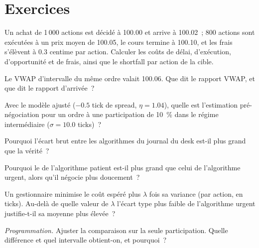 \section{Exercices}

\begin{exercise}[$\star$]\label{exo:mx:transaction-cost-analysis:1}
Un achat de 1\,000 actions est décidé à 100.00 et arrive à 100.02~; 800 actions sont exécutées à un prix moyen de 100.05, le cours termine à 100.10, et les frais s'élèvent à 0.3
centime par action. Calculer les coûts de délai, d'exécution, d'opportunité et de frais, ainsi que le shortfall par action de la cible.
\end{exercise}

\begin{exercise}[$\star$]\label{exo:mx:transaction-cost-analysis:2}
Le VWAP d'intervalle du même ordre valait 100.06. Que dit le rapport VWAP, et que dit le rapport d'arrivée~?
\end{exercise}

\begin{exercise}[$\star$]\label{exo:mx:transaction-cost-analysis:3}
Avec le modèle ajusté ($-0.5$ tick de spread, $\eta=1.04$), quelle est l'estimation pré-négociation pour un ordre à une participation de 10~\% dans le régime intermédiaire
($\sigma=10.0$ ticks)~?
\end{exercise}

\begin{exercise}[$\star\star$]\label{exo:mx:transaction-cost-analysis:4}
Pourquoi l'écart brut entre les algorithmes du journal du desk est-il plus grand que la vérité~?
\end{exercise}

\begin{exercise}[$\star\star$]\label{exo:mx:transaction-cost-analysis:5}
Pourquoi le  de l'algorithme patient est-il plus grand que celui de l'algorithme urgent, alors qu'il négocie plus doucement~?
\end{exercise}

\begin{exercise}[$\star\star$]\label{exo:mx:transaction-cost-analysis:6}
Un gestionnaire minimise le coût espéré plus $\lambda$ fois sa variance (par action, en ticks). Au-delà de quelle valeur de $\lambda$ l'écart type plus faible de l'algorithme urgent
justifie-t-il sa moyenne plus élevée~?
\end{exercise}

\begin{exercise}[$\star\star\star$]\label{exo:mx:transaction-cost-analysis:7}
\emph{Programmation.} Ajuster la comparaison sur la seule participation. Quelle différence et quel intervalle obtient-on, et pourquoi~?
\end{exercise}

